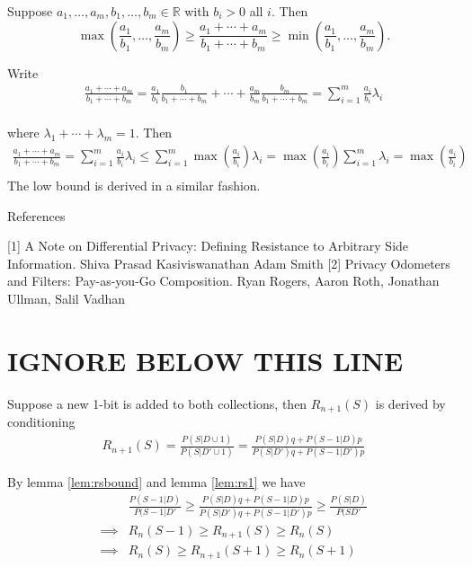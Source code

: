\documentclass[11pt]{article}
\newcommand{\R}{\mathbb{R}}
\begin{document}
\begin{lem} \label{lem:rsbound}
Suppose $a_1,\dots,a_m,b_1,\dots,b_m \in \R$ with $b_i > 0$ all $i$.
Then 
\[ \max\left(\frac{a_1}{b_1},\dots,\frac{a_m}{b_m}\right) \geq  \frac{a_1 + \cdots + a_m}{b_1 + \cdots + b_m} \geq \min \left(\frac{a_1}{b_1},\dots,\frac{a_m}{b_m}\right). \]
\end{lem}
\begin{pf}
Write
 \begin{align*}
  \frac{a_1 + \cdots + a_m}{b_1 + \cdots + b_m}
= \frac{a_1}{b_1}\frac{b_1}{b_1+\cdots+b_m} +
\cdots + \frac{a_m}{b_m}\frac{b_m}{b_1+\cdots+b_m} = \sum_{i=1}^m \frac{a_i}{b_i} \lambda_i  \\ 
\end{align*}

where $\lambda_1 + \cdots + \lambda_m = 1$.  Then
 \begin{align*}
  \frac{a_1 + \cdots + a_m}{b_1 + \cdots + b_m} = \sum_{i=1}^m \frac{a_i}{b_i} \lambda_i  \leq  \sum_{i=1}^m \max \left ( \frac{a_i}{b_i} \right ) \lambda_i  = \max \left ( \frac{a_i}{b_i} \right ) \sum_{i=1}^m \lambda_i = \max \left ( \frac{a_i}{b_i} \right ) \\ 
\end{align*}
The low bound is derived in a similar fashion. 
\end{pf}


\newpage

References

[1] A Note on Differential Privacy: Defining Resistance to Arbitrary Side Information.  Shiva Prasad Kasiviswanathan Adam Smith
[2] Privacy Odometers and Filters: Pay-as-you-Go Composition. Ryan Rogers, Aaron Roth, Jonathan Ullman, Salil Vadhan


 \newpage
 \section{IGNORE BELOW THIS LINE}
 
 Suppose a new 1-bit is added to both collections, then $R_{n+1}(S)$ is derived by conditioning
 \begin{align*}
R_{n+1}(S) = \frac{ P(S|D \cup 1) }{ P(S|D' \cup 1) } = \frac { P(S|D)q + P(S-1|D)p } { P(S|D')q + P(S-1|D')p}
\end{align*}
 
By lemma \eqref{lem:rsbound} and lemma  \eqref{lem:rs1} we have
\begin{align}
 & \frac{P(S-1|D)}{P(S-1|D'} \ge  \frac { P(S|D)q + P(S-1|D)p } { P(S|D')q + P(S-1|D')p} \ge \frac{P(S|D)}{P(SD'} \\
\implies & R_n(S-1) \ge R_{n+1}(S) \ge R_n(S) \\
\implies & R_n(S) \ge R_{n+1}(S+1) \ge R_n(S+1) \label{lem:rsb2}
\end{align}
 
\end{document}
